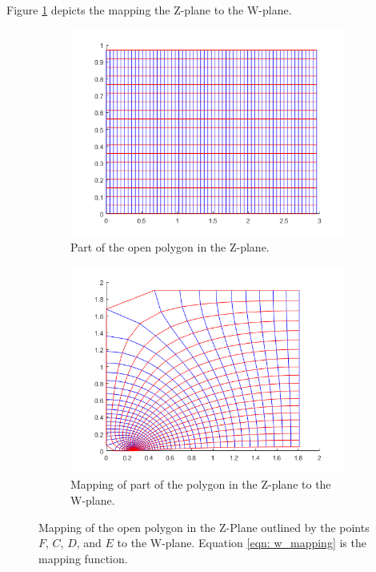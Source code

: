 \noindent Figure \ref{fig:Z_to_w_mapping} depicts the mapping the Z-plane to the W-plane. 

\begin{figure}[H]
    \centering
    \begin{subfigure}[t]{0.45\textwidth}
        \centering
        \includegraphics[width=\textwidth]{images/z2w_zplane.png}
        \caption{Part of the open polygon in the Z-plane.}
    \end{subfigure}
    \hfill
    \begin{subfigure}[t]{0.45\textwidth}
        \centering
        \includegraphics[width=\textwidth]{images/z2w_w-plane.png}
        \caption{Mapping of part of the polygon in the Z-plane to the W-plane.}
    \end{subfigure} 
    \caption[Mapping of the open polygon in the Z-Plane to the W-plane.]{Mapping of the open polygon in the Z-Plane outlined by the points $F$, $C$, $D$, and $E$ to the W-plane. Equation \ref{eqn: w_mapping} is the mapping function.} 
    \label{fig:Z_to_w_mapping}
 \end{figure}

